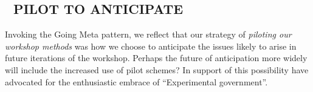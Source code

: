 \subsection*{💎 PILOT TO ANTICIPATE {\hfill \sensory}}

Invoking the {\sc Going Meta} pattern, we reflect that our strategy of
\emph{piloting our workshop methods} was how we choose to anticipate
the issues likely to arise in future iterations of the workshop.
Perhaps the future of anticipation more widely will include the
increased use of pilot schemes?  In support of this possibility \citet{unger2019imagination} have advocated for the enthusiastic embrace of “Experimental government”.
